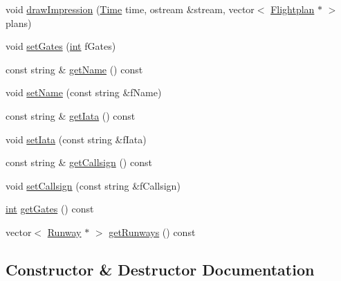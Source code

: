 \begin{DoxyCompactItemize}
\item 
void \hyperlink{classAirport_a6bc9b678b5f9f0c9f2d9c179436766ef}{draw\+Impression} (\hyperlink{classTime}{Time} time, ostream \&stream, vector$<$ \hyperlink{classFlightplan}{Flightplan} $\ast$ $>$ plans)
\item 
void \hyperlink{classAirport_af2c69fb8b654073f978b9bf373b3216f}{set\+Gates} (\hyperlink{CMakeCache_8txt_a79a3d8790b2588b09777910863574e09}{int} f\+Gates)
\item 
const string \& \hyperlink{classAirport_a9b6eb908a82342b64dda9a72f9369d43}{get\+Name} () const 
\item 
void \hyperlink{classAirport_aef847257fe845bbcbc2ac446663481c0}{set\+Name} (const string \&f\+Name)
\item 
const string \& \hyperlink{classAirport_a4550198ddc92d3583a0f3c31278189b2}{get\+Iata} () const 
\item 
void \hyperlink{classAirport_ae4698bb1842fc83574c1650425c8daa6}{set\+Iata} (const string \&f\+Iata)
\item 
const string \& \hyperlink{classAirport_a6ed56e05a8c881b8e4718a34ba9cccc5}{get\+Callsign} () const 
\item 
void \hyperlink{classAirport_a5e682d5e40ba9513f075348d51a9cb53}{set\+Callsign} (const string \&f\+Callsign)
\item 
\hyperlink{CMakeCache_8txt_a79a3d8790b2588b09777910863574e09}{int} \hyperlink{classAirport_a4d23d65ad0ba4d3878e9e32429dd9286}{get\+Gates} () const 
\item 
vector$<$ \hyperlink{classRunway}{Runway} $\ast$ $>$ \hyperlink{classAirport_a14310ffeba8a024105071c156fd42cf7}{get\+Runways} () const 
\end{DoxyCompactItemize}


\subsection{Constructor \& Destructor Documentation}
